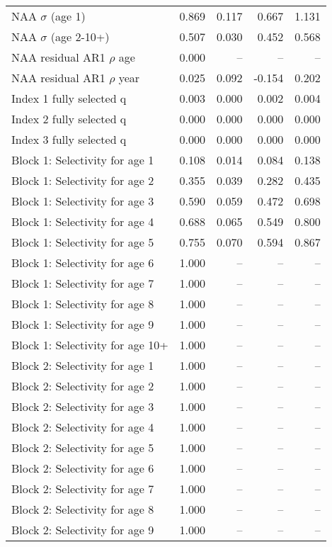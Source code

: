 \documentclass[
]{article}
\begin{document}
\begin{landscape}
\begin{longtable}[t]{lrrrr}
\endfoot
\bottomrule
\endlastfoot
NAA $\sigma$ (age 1) & 0.869 & 0.117 & 0.667 & 1.131\\
NAA $\sigma$ (age 2-10+) & 0.507 & 0.030 & 0.452 & 0.568\\
NAA residual AR1 $\rho$ age & 0.000 & -- & -- & --\\
NAA residual AR1 $\rho$ year & 0.025 & 0.092 & -0.154 & 0.202\\
Index 1 fully selected q & 0.003 & 0.000 & 0.002 & 0.004\\
\addlinespace
Index 2 fully selected q & 0.000 & 0.000 & 0.000 & 0.000\\
Index 3 fully selected q & 0.000 & 0.000 & 0.000 & 0.000\\
Block 1: Selectivity for age 1 & 0.108 & 0.014 & 0.084 & 0.138\\
Block 1: Selectivity for age 2 & 0.355 & 0.039 & 0.282 & 0.435\\
Block 1: Selectivity for age 3 & 0.590 & 0.059 & 0.472 & 0.698\\
\addlinespace
Block 1: Selectivity for age 4 & 0.688 & 0.065 & 0.549 & 0.800\\
Block 1: Selectivity for age 5 & 0.755 & 0.070 & 0.594 & 0.867\\
Block 1: Selectivity for age 6 & 1.000 & -- & -- & --\\
Block 1: Selectivity for age 7 & 1.000 & -- & -- & --\\
Block 1: Selectivity for age 8 & 1.000 & -- & -- & --\\
\addlinespace
Block 1: Selectivity for age 9 & 1.000 & -- & -- & --\\
Block 1: Selectivity for age 10+ & 1.000 & -- & -- & --\\
Block 2: Selectivity for age 1 & 1.000 & -- & -- & --\\
Block 2: Selectivity for age 2 & 1.000 & -- & -- & --\\
Block 2: Selectivity for age 3 & 1.000 & -- & -- & --\\
\addlinespace
Block 2: Selectivity for age 4 & 1.000 & -- & -- & --\\
Block 2: Selectivity for age 5 & 1.000 & -- & -- & --\\
Block 2: Selectivity for age 6 & 1.000 & -- & -- & --\\
Block 2: Selectivity for age 7 & 1.000 & -- & -- & --\\
Block 2: Selectivity for age 8 & 1.000 & -- & -- & --\\
\addlinespace
Block 2: Selectivity for age 9 & 1.000 & -- & -- & --\\

\end{longtable}
\end{landscape}
\end{document}
